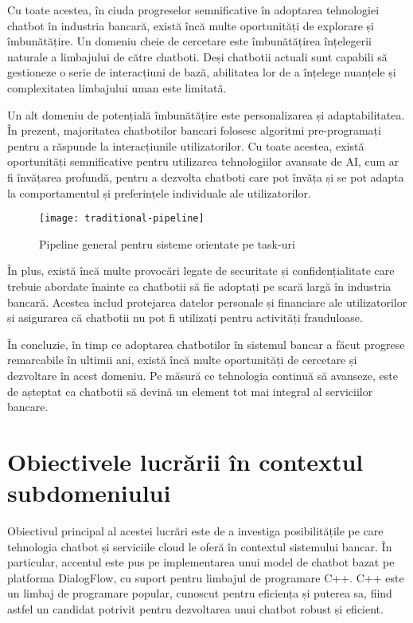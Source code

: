 Cu toate acestea, în ciuda progreselor semnificative în adoptarea tehnologiei chatbot în industria bancară, există încă multe oportunități de explorare și îmbunătățire. Un domeniu cheie de cercetare este îmbunătățirea înțelegerii naturale a limbajului de către chatboti. Deși chatbotii actuali sunt capabili să gestioneze o serie de interacțiuni de bază, abilitatea lor de a înțelege nuanțele și complexitatea limbajului uman este limitată.

Un alt domeniu de potențială îmbunătățire este personalizarea și adaptabilitatea. În prezent, majoritatea chatbotilor bancari folosesc algoritmi pre-programați pentru a răspunde la interacțiunile utilizatorilor. Cu toate acestea, există oportunități semnificative pentru utilizarea tehnologiilor avansate de AI, cum ar fi învățarea profundă, pentru a dezvolta chatboti care pot învăța și se pot adapta la comportamentul și preferințele individuale ale utilizatorilor.

\begin{figure}[h] %
    \centering
    \texttt{[image: traditional-pipeline]}
    \caption{Pipeline general pentru sisteme orientate pe task-uri \cite{chen_liu_yin_tang_dialogue_2017}}
    \label{fig:traditional-pipeline}
\end{figure}

În plus, există încă multe provocări legate de securitate și confidențialitate care trebuie abordate înainte ca chatbotii să fie adoptați pe scară largă în industria bancară. Acestea includ protejarea datelor personale și financiare ale utilizatorilor și asigurarea că chatbotii nu pot fi utilizați pentru activități frauduloase.

În concluzie, în timp ce adoptarea chatbotilor în sistemul bancar a făcut progrese remarcabile în ultimii ani, există încă multe oportunități de cercetare și dezvoltare în acest domeniu. Pe măsură ce tehnologia continuă să avanseze, este de așteptat ca chatbotii să devină un element tot mai integral al serviciilor bancare.

\section{Obiectivele lucrării în contextul subdomeniului}

Obiectivul principal al acestei lucrări este de a investiga posibilitățile pe care tehnologia chatbot și serviciile cloud le oferă în contextul sistemului bancar. În particular, accentul este pus pe implementarea unui model de chatbot bazat pe platforma DialogFlow, cu suport pentru limbajul de programare C++. C++ este un limbaj de programare popular, cunoscut pentru eficiența și puterea sa, fiind astfel un candidat potrivit pentru dezvoltarea unui chatbot robust și eficient.

